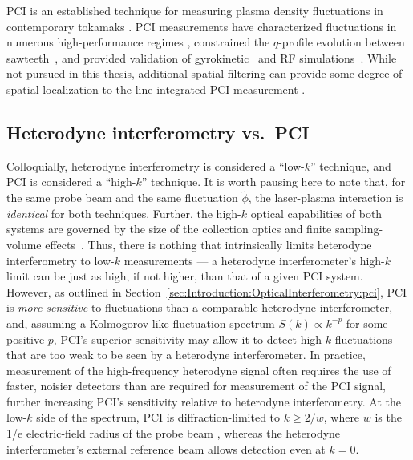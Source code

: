 PCI is an established technique for measuring plasma density fluctuations
in contemporary tokamaks
\cite{coda_phd, mazurenko_phd, marinoni_phd}.
PCI measurements have
characterized fluctuations in numerous high-performance regimes
\cite{coda_LH_transition,coda_ELMs,rost_pp14,marinoni_nf15,mazurenko_prl02},
constrained the $q$-profile evolution between sawteeth~\cite{edlund_prl09}, and
provided validation of gyrokinetic~\cite{lin_pp09,rost_pp10,ennever_pp15}
and RF simulations~\cite{tsujii_pp15}.
While not pursued in this thesis,
additional spatial filtering can provide
some degree of spatial localization
to the line-integrated PCI measurement
\cite{dorris_rsi09, lin_rsi06}.


\subsection{Heterodyne interferometry vs.\ PCI}
Colloquially, heterodyne interferometry
is considered a ``low-$k$'' technique, and
PCI is considered a ``high-$k$'' technique.
It is worth pausing here to note that,
for the same probe beam and the same fluctuation $\tilde{\phi}$,
the laser-plasma interaction is \emph{identical} for both techniques.
Further, the high-$k$ optical capabilities of both systems
are governed by the size of the collection optics
and finite sampling-volume effects~\cite{bravenec_rsi95}.
Thus, there is nothing that intrinsically limits
heterodyne interferometry to low-$k$ measurements ---
a heterodyne interferometer's high-$k$ limit
can be just as high, if not higher,
than that of a given PCI system.
However, as outlined in
Section~\ref{sec:Introduction:OpticalInterferometry:pci},
PCI is \emph{more sensitive} to fluctuations
than a comparable heterodyne interferometer, and,
assuming a Kolmogorov-like fluctuation spectrum
$S(k) \propto k^{-p}$ for some positive $p$,
PCI's superior sensitivity may allow it
to detect high-$k$ fluctuations
that are too weak to be seen by a heterodyne interferometer.
In practice, measurement of the high-frequency heterodyne signal
often requires the use of faster, noisier detectors
than are required for measurement of the PCI signal,
further increasing PCI's sensitivity relative to heterodyne interferometry.
At the low-$k$ side of the spectrum,
PCI is diffraction-limited to $k \geq 2 / w$,
where $w$ is the 1/e electric-field radius of the probe beam
\cite{dorris_rsi09},
whereas the heterodyne interferometer's external reference beam
allows detection even at $k = 0$.


